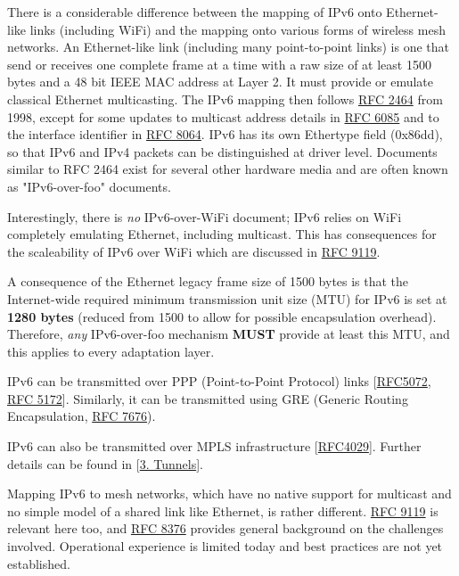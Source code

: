 \documentclass[
]{article}
\begin{document}
There is a considerable difference between the mapping of IPv6 onto
Ethernet-like links (including WiFi) and the mapping onto various forms
of wireless mesh networks. An Ethernet-like link (including many
point-to-point links) is one that send or receives one complete frame at
a time with a raw size of at least 1500 bytes and a 48 bit IEEE MAC
address at Layer 2. It must provide or emulate classical Ethernet
multicasting. The IPv6 mapping then follows
\href{https://www.rfc-editor.org/info/rfc2464}{RFC 2464} from 1998,
except for some updates to multicast address details in
\href{https://www.rfc-editor.org/info/rfc6085}{RFC 6085} and to the
interface identifier in
\href{https://www.rfc-editor.org/info/rfc8064}{RFC 8064}. IPv6 has its
own Ethertype field (0x86dd), so that IPv6 and IPv4 packets can be
distinguished at driver level. Documents similar to RFC 2464 exist for
several other hardware media and are often known as "IPv6-over-foo"
documents.

Interestingly, there is \emph{no} IPv6-over-WiFi document; IPv6 relies
on WiFi completely emulating Ethernet, including multicast. This has
consequences for the scaleability of IPv6 over WiFi which are discussed
in \href{https://www.rfc-editor.org/info/rfc9119}{RFC 9119}.

A consequence of the Ethernet legacy frame size of 1500 bytes is that
the Internet-wide required minimum transmission unit size (MTU) for IPv6
is set at \textbf{1280 bytes} (reduced from 1500 to allow for possible
encapsulation overhead). Therefore, \emph{any} IPv6-over-foo mechanism
\textbf{MUST} provide at least this MTU, and this applies to every
adaptation layer.

IPv6 can be transmitted over PPP (Point-to-Point Protocol) links
{[}\href{https://www.rfc-editor.org/info/rfc5072}{RFC5072},
\href{https://www.rfc-editor.org/info/rfc5172}{RFC 5172}{]}. Similarly,
it can be transmitted using GRE (Generic Routing Encapsulation,
\href{https://www.rfc-editor.org/info/rfc7676}{RFC 7676}).

IPv6 can also be transmitted over MPLS infrastructure
{[}\href{https://www.rfc-editor.org/info/rfc4029}{RFC4029}{]}. Further
details can be found in {[}\hyperref[tunnels]{3. Tunnels}{]}.

Mapping IPv6 to mesh networks, which have no native support for
multicast and no simple model of a shared link like Ethernet, is rather
different. \href{https://www.rfc-editor.org/info/rfc9119}{RFC 9119} is
relevant here too, and
\href{https://www.rfc-editor.org/info/rfc8376}{RFC 8376} provides
general background on the challenges involved. Operational experience is
limited today and best practices are not yet established.
\end{document}
